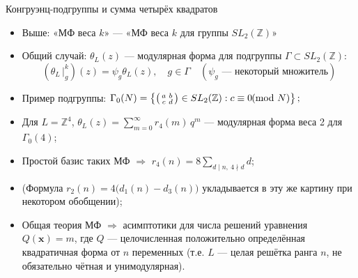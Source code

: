 \documentclass[serif, aspectratio=169]{beamer}
\begin{document}
\begin{frame}{Конгруэнц-подгруппы и сумма четырёх квадратов}
    \begin{itemize}
        \item Выше: «МФ веса $k$» --- «МФ веса $k$ для группы $SL_2(\mathbb{Z})$»
        \item Общий случай: $\theta_L(z)$ --- модулярная форма для подгруппы $\Gamma\subset SL_2(\mathbb{Z})$:
        \[(\theta_L\,|_g^k)(z)=\psi_g \theta_L(z), \quad g\in\Gamma\quad (\psi_g\text{ --- некоторый множитель})\]
        \item Пример подгруппы:
        $\Gamma_0(N) = \left\{\begin{psmallmatrix}a&b\\c&d\end{psmallmatrix}\in SL_2(\mathbb{Z}) : c\equiv 0 \!\!\!\pmod N\right\};$
        \item Для $L=\mathbb{Z}^4$, $\theta_L(z) = \sum_{m=0}^\infty r_4(m)\,q^m$ --- модулярная форма веса 2 для $\Gamma_0(4)$;
        \item Простой базис таких МФ $\Rightarrow$ $r_4(n) = 8\sum_{d\mid n,\ 4\nmid d} d$;
        \item (Формула $r_2(n) = 4\big(d_1(n)-d_3(n)\big)$ укладывается в эту же картину при некотором обобщении);
        \item Общая теория МФ $\Rightarrow$ асимптотики для числа решений уравнения $Q(\mathbf{x})=m$, где $Q$ --- целочисленная положительно определённая квадратичная форма от $n$ переменных (т.е. $L$ --- целая решётка ранга $n$, не обязательно чётная и унимодулярная).
    \end{itemize}

\end{frame}
\end{document}
